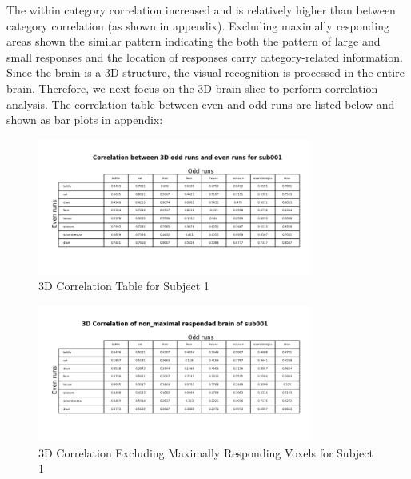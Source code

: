 \documentclass[11pt,twocolumn]{article}
\begin{document}
The within category correlation increased and is relatively  higher than
between category correlation (as shown in appendix). Excluding maximally
responding areas shown the similar pattern indicating the both the pattern of
large and small responses and the location of responses carry category-related
information.\\

Since the brain is a 3D structure, the visual recognition is processed in the
entire brain. Therefore, we next focus on the 3D brain slice to perform 
correlation analysis. The correlation table between even and odd runs are
listed below and shown as bar plots in appendix:

\begin{figure}[h!]                                                              
\centering                                                                      
\includegraphics[width=90mm]{3d_correlation_table_sub001.png}                   
\caption{3D Correlation Table for Subject 1}                                    
\end{figure}                                                                    
                                                                                
\begin{figure}[h!]                                                              
\centering                                                                      
\includegraphics[width=90mm]{3d_non_max_correlation_table_sub001.png}           
\caption{3D Correlation Excluding Maximally Responding Voxels for Subject 1}    
\end{figure}     
\end{document}
